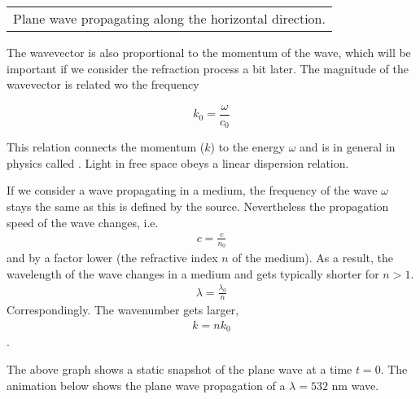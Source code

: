 \documentclass[letterpaper,10pt,english]{sphinxmanual}
\begin{document}
\begin{savenotes}\sphinxattablestart
\centering
\begin{tabulary}{\linewidth}[t]{|T|}
\hline
\sphinxstyletheadfamily 
{}
\\
\hline
{} Plane wave propagating along the horizontal direction.
\\
\hline
\end{tabulary}
\par
\sphinxattableend\end{savenotes}

The wavevector is also proportional to the momentum of the wave, which will be important if we consider the refraction process a bit later. The magnitude of the wavevector is related wo the frequency

\begin{equation}
k_{0}=\frac{\omega}{c_{0}}
\end{equation}

This relation connects the momentum (\(k\)) to the energy \(\omega\) and is in general in physics called . Light in free space obeys a linear dispersion relation.

If we consider a wave propagating in a medium, the frequency of the wave \(\omega\) stays the same as this is defined by the source. Nevertheless the propagation speed of the wave changes, i.e.
\begin{equation*}
\begin{split}c=\frac{c}{n_0}\end{split}
\end{equation*}
and by a factor lower (the refractive index \(n\) of the medium). As a result, the wavelength of the wave changes in a medium and gets typically shorter for \(n>1\).
\begin{equation*}
\begin{split}\lambda=\frac{\lambda_0}{n}\end{split}
\end{equation*}
Correspondingly. The wavenumber gets larger,
\begin{equation*}
\begin{split}k=nk_{0}\end{split}
\end{equation*}
.

The above graph shows a static snapshot of the plane wave at a time \(t=0\). The animation below shows the plane wave propagation of a \(\lambda=532\) nm wave.
\end{document}
